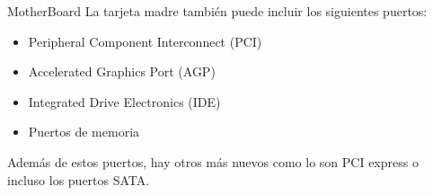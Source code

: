 \documentclass[11pt]{beamer}
\begin{document}
		\begin{frame}{MotherBoard}
			La tarjeta madre también puede incluir los siguientes puertos:
			\begin{itemize}
				\item Peripheral Component Interconnect (PCI)
				\item Accelerated Graphics Port (AGP)
				\item Integrated Drive Electronics (IDE)
				\item Puertos de memoria
			\end{itemize}
			Además de estos puertos, hay otros más nuevos como lo son PCI express o incluso los puertos SATA.
		\end{frame}
\end{document}
